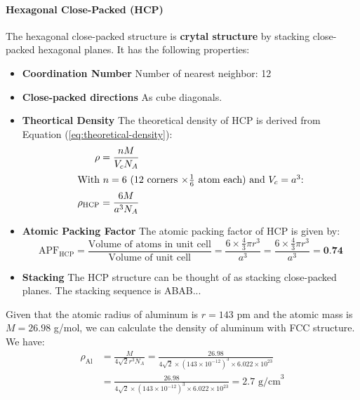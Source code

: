 \documentclass[11pt]{report}
\begin{document}
\paragraph{Hexagonal Close-Packed (HCP)} The hexagonal close-packed structure is \textbf{crytal structure} by stacking close-packed hexagonal planes. It has the following properties:
\begin{itemize}
    \item \textbf{Coordination Number} Number of nearest neighbor: 12
    \item \textbf{Close-packed directions} As cube diagonals.
    \item \textbf{Theortical Density} The theoretical density of HCP is derived from Equation (\ref{eq:theoretical-density}):
    \begin{align}
        \rho &= \frac{nM}{V_c N_A} \nonumber \\
        \intertext{With $n = 6$ (12 corners $\times \frac{1}{6}$ atom each) and $V_c = a^3$:}
        \rho_\text{HCP} &= \frac{6M}{a^3 N_A} 
    \end{align}
    \item \textbf{Atomic Packing Factor} The atomic packing factor of HCP is given by:
    \begin{equation}
        \text{APF}_\text{HCP} = \frac{\text{Volume of atoms in unit cell}}{\text{Volume of unit cell} } = \frac{6 \times \frac{4}{3}\pi r^3}{a^3} = \frac{6 \times \frac{4}{3}\pi r^3}{a^3} = \textbf{0.74}
    \end{equation}
    \item \textbf{Stacking} The HCP structure can be thought of as stacking close-packed planes. The stacking sequence is ABAB...
\end{itemize}
\begin{example}
    Given that the atomic radius of aluminum is $r = 143$ pm and the atomic mass is $M = 26.98$ g/mol, we can calculate the density of aluminum with FCC structure. We have:
    \begin{align*}
        \rho_\text{Al} &= \frac{M}{4\sqrt{2}r^3 N_A} = \frac{26.98}{4\sqrt{2} \times (143 \times 10^{-12})^3 \times 6.022 \times 10^{23}} \\
        &= \frac{26.98}{4\sqrt{2} \times (143 \times 10^{-12})^3 \times 6.022 \times 10^{23}} = 2.7 \text{ g/cm}^3
    \end{align*}
\end{example}
\end{document}
